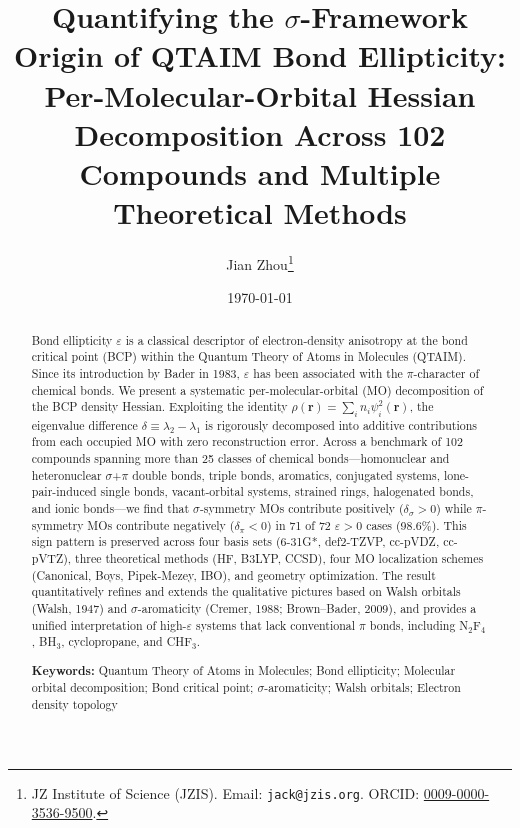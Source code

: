 \documentclass[11pt,a4paper]{article}
\newcommand{\delsg}{\delta_{\sigma}}
\newcommand{\delpi}{\delta_{\pi}}
\newcommand{\eps}{\varepsilon}
\begin{document}
\title{Quantifying the $\sigma$-Framework Origin of QTAIM Bond Ellipticity:
Per-Molecular-Orbital Hessian Decomposition Across 102 Compounds and
Multiple Theoretical Methods}


\author{Jian Zhou\thanks{JZ Institute of Science (JZIS). Email: \texttt{jack@jzis.org}. ORCID: \href{https://orcid.org/0009-0000-3536-9500}{0009-0000-3536-9500}.}}



\date{\today}

\maketitle

\begin{abstract}
Bond ellipticity $\eps$ is a classical descriptor of electron-density
anisotropy at the bond critical point (BCP) within the Quantum Theory of
Atoms in Molecules (QTAIM). Since its introduction by Bader in 1983,
$\eps$ has been associated with the $\pi$-character of chemical bonds.
We present a systematic per-molecular-orbital (MO) decomposition of the
BCP density Hessian. Exploiting the identity $\rho(\mathbf{r}) =
\sum_{i} n_i \psi_i^2(\mathbf{r})$, the eigenvalue difference $\delta
\equiv \lambda_2 - \lambda_1$ is rigorously decomposed into additive
contributions from each occupied MO with zero reconstruction error.
Across a benchmark of 102 compounds spanning more than 25 classes of
chemical bonds---homonuclear and heteronuclear $\sigma$+$\pi$ double
bonds, triple bonds, aromatics, conjugated systems, lone-pair-induced
single bonds, vacant-orbital systems, strained rings, halogenated bonds,
and ionic bonds---we find that $\sigma$-symmetry MOs contribute
positively ($\delsg > 0$) while $\pi$-symmetry MOs contribute negatively
($\delpi < 0$) in 71 of 72 $\eps > 0$ cases (98.6\%). This sign pattern
is preserved across four basis sets (6-31G*, def2-TZVP, cc-pVDZ,
cc-pVTZ), three theoretical methods (HF, B3LYP, CCSD), four MO
localization schemes (Canonical, Boys, Pipek-Mezey, IBO), and geometry
optimization. The result quantitatively refines and extends the
qualitative pictures based on Walsh orbitals
(Walsh, 1947) and $\sigma$-aromaticity (Cremer, 1988; Brown--Bader,
2009), and provides a unified interpretation of high-$\eps$ systems
that lack conventional $\pi$ bonds, including N$_2$F$_4$, BH$_3$,
cyclopropane, and CHF$_3$.

\textbf{Keywords:} Quantum Theory of Atoms in Molecules; Bond ellipticity; Molecular orbital decomposition; Bond critical point; $\sigma$-aromaticity; Walsh orbitals; Electron density topology

\renewcommand{\abstract}{}
\end{abstract}
\end{document}
